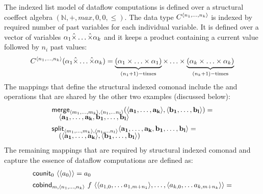 \begin{example}
\label{thm:struct-dfl}
The indexed list model of dataflow computations is defined over a structural coeffect
algebra $(\mathbb{N}, +, \mathit{max}, 0, 0, \leq)$. The data type $\ctyp{\langle n_1, \ldots, n_k\rangle}$
is indexed by required number of past variables for each individual variable. It is defined
over a vector of variables $\alpha_1 \hat{\times} \ldots \hat{\times} \alpha_k$ and it keeps a product
containing a current value followed by $n_i$ past values:
%
\begin{equation*}
C^{\langle n_1, \ldots, n_k\rangle}(\alpha_1 \hat{\times} \ldots \hat{\times} \alpha_k) =
\underbrace{(\alpha_1 \times \ldots \times \alpha_1)}_{(n_1+1)-\textnormal{times}} \times \ldots \times
  \underbrace{(\alpha_k \times \ldots \times \alpha_k)}_{(n_k+1)-\textnormal{times}}
\end{equation*}
%
The mappings that define the structural indexed comonad include the  and 
operations that are shared by the other two examples (discussed below):
%
\begin{equation*}
\begin{array}{l}
\textnormal{\sffamily merge}_{\langle m_1, \ldots, m_k \rangle, \langle n_1, \ldots n_l \rangle}
  (\langle \mathbf{a_1}, \ldots, \mathbf{a_k} \rangle, \langle \mathbf{b_1}, \ldots, \mathbf{b_l}\rangle) = \\[-0.25em]
\quad \langle \mathbf{a_1}, \ldots, \mathbf{a_k}, \mathbf{b_1}, \ldots, \mathbf{b_l}\rangle
\\[0.45em]
\textnormal{\sffamily split}_{\langle m_1, \ldots, m_k \rangle, \langle n_1, \ldots n_l \rangle}
   \langle \mathbf{a_1}, \ldots, \mathbf{a_k}, \mathbf{b_1}, \ldots, \mathbf{b_l}\rangle = \\[-0.25em]
\quad (\langle \mathbf{a_1}, \ldots, \mathbf{a_k} \rangle, \langle \mathbf{b_1}, \ldots, \mathbf{b_l}\rangle)
\end{array}
\end{equation*}
%
The remaining mappings that are required by structural indexed comonad and capture the
essence of dataflow computations are defined as:
%
\begin{equation*}
\begin{array}{l}
\textnormal{\sffamily counit}_{0}~\langle \langle a_0 \rangle \rangle = a_0
\\[0.45em]
\textnormal{\sffamily cobind}_{m, \langle n_1, \ldots, n_k \rangle}~f~
  \langle \langle a_{1,0}, \ldots a_{1,m+{n_1}} \rangle, \ldots, \langle a_{k,0}, \ldots a_{k,m+{n_k}} \rangle \rangle = \\[-0.25em]

\end{array}
\end{equation*}
\end{example}
